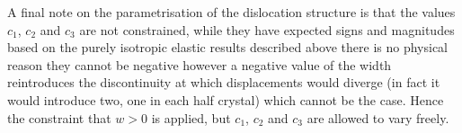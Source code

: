 A final note on the parametrisation of the dislocation structure is that the values $c_1$, $c_2$ and $c_3$ are not constrained, while they have expected signs and magnitudes based on the purely isotropic elastic results described above there is no physical reason they cannot be negative however a negative value of the width reintroduces the discontinuity at which displacements would diverge (in fact it would introduce two, one in each half crystal) which cannot be the case. Hence the constraint that $w>0$ is applied, but $c_1$, $c_2$ and $c_3$ are allowed to vary freely.





